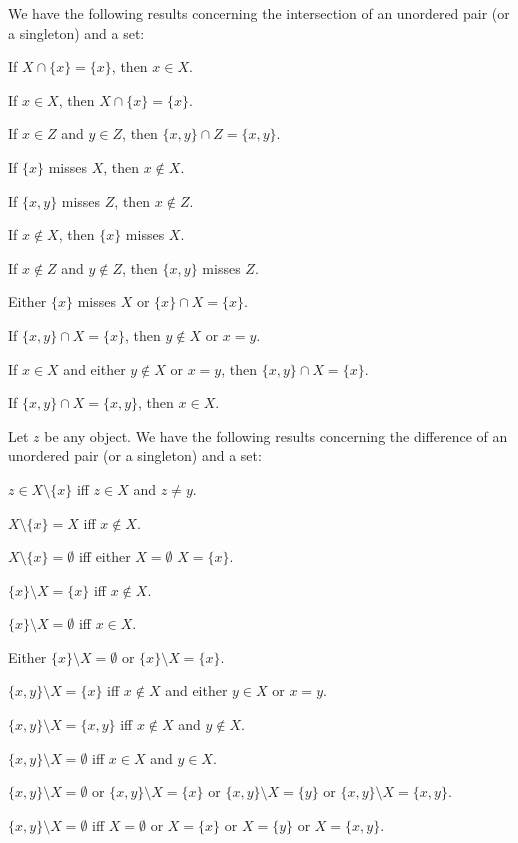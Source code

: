 \documentclass{article}
\begin{document}
\medbreak
We have the following results concerning the intersection of an
unordered pair (or a singleton) and a set:

\begin{thm}
\item\label{zfmisc1:45} If $X\cap\{x\}=\{x\}$, then $x\in X$.
\item\label{zfmisc1:46} If $x\in X$, then $X\cap\{x\}=\{x\}$.
\item\label{zfmisc1:47} If $x\in Z$ and $y\in Z$, then $\{x,y\}\cap Z=\{x,y\}$.
\item\label{zfmisc1:48} If $\{x\}$ misses $X$, then $x\notin X$.
\item\label{zfmisc1:49} If $\{x,y\}$ misses $Z$, then $x\notin Z$.
\item\label{zfmisc1:50} If $x\notin X$, then $\{x\}$ misses $X$.
\item\label{zfmisc1:51} If $x\notin Z$ and $y\notin Z$, then $\{x,y\}$ misses $Z$.
\item\label{zfmisc1:52} Either $\{x\}$ misses $X$ or $\{x\}\cap X=\{x\}$.
\item\label{zfmisc1:53} If $\{x,y\}\cap X=\{x\}$, then $y\notin X$ or $x=y$.
\item\label{zfmisc1:54} If $x\in X$ and either $y\notin X$ or $x=y$,
  then $\{x,y\}\cap X=\{x\}$.
\item\label{zfmisc1:55} If $\{x,y\}\cap X=\{x,y\}$, then $x\in X$.
\end{thm}

\medbreak
Let $z$ be any object.
We have the following results concerning the difference of an unordered
pair (or a singleton) and a set:
\begin{thm}
\item\label{zfmisc1:56} $z\in X\setminus\{x\}$ iff $z\in X$ and $z\neq y$.
\item\label{zfmisc1:57} $X\setminus\{x\}=X$ iff $x\notin X$. 
\item\label{zfmisc1:58} $X\setminus\{x\}=\emptyset$ iff either $X=\emptyset$
  $X=\{x\}$.
\item\label{zfmisc1:59} $\{x\}\setminus X=\{x\}$ iff $x\notin X$.
\item\label{zfmisc1:60} $\{x\}\setminus X=\emptyset$ iff $x\in X$.
\item\label{zfmisc1:61} Either $\{x\}\setminus X=\emptyset$ or $\{x\}\setminus X=\{x\}$.
\item\label{zfmisc1:62} $\{x,y\}\setminus X=\{x\}$ iff $x\notin X$ and
  either $y\in X$ or $x=y$.
\item\label{zfmisc1:63} $\{x,y\}\setminus X=\{x,y\}$ iff $x\notin X$ and
  $y\notin X$.
\item\label{zfmisc1:64} $\{x,y\}\setminus X=\emptyset$ iff $x\in X$ and
  $y\in X$.
\item\label{zfmisc1:65} $\{x,y\}\setminus X=\emptyset$ or
  $\{x,y\}\setminus X=\{x\}$ or $\{x,y\}\setminus X=\{y\}$ or $\{x,y\}\setminus X=\{x,y\}$.
\item\label{zfmisc1:66} $\{x,y\}\setminus X=\emptyset$ iff $X=\emptyset$
  or $X=\{x\}$ or $X=\{y\}$ or $X=\{x,y\}$.
\end{thm}
\end{document}

